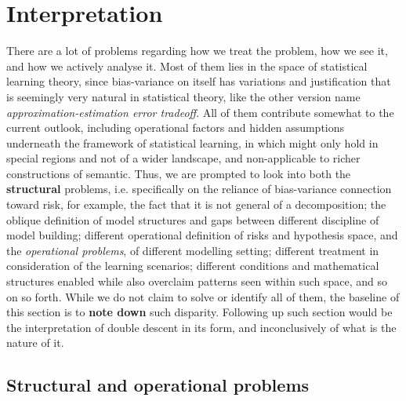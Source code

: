 \chapter{Interpretation}

There are a lot of problems regarding how we treat the problem, how we see it, and how we actively analyse it. Most of them lies in the space of statistical learning theory, since bias-variance on itself has variations and justification that is seemingly very natural in statistical theory, like the other version name \textit{approximation-estimation error tradeoff}. All of them contribute somewhat to the current outlook, including operational factors and hidden assumptions underneath the framework of statistical learning, in which might only hold in special regions and not of a wider landscape, and non-applicable to richer constructions of semantic. Thus, we are prompted to look into both the \textbf{structural} problems, i.e. specifically on the reliance of bias-variance connection toward risk, for example, the fact that it is not general of a decomposition; the oblique definition of model structures and gaps between different discipline of model building; different operational definition of risks and hypothesis space, and the \textit{operational problems}, of different modelling setting; different treatment in consideration of the learning scenarios; different conditions and mathematical structures enabled while also overclaim patterns seen within such space, and so on so forth. While we do not claim to solve or identify all of them, the baseline of this section is to \textbf{note down} such disparity. Following up such section would be the interpretation of double descent in its form, and inconclusively of what is the nature of it. 

\section{Structural and operational problems}

